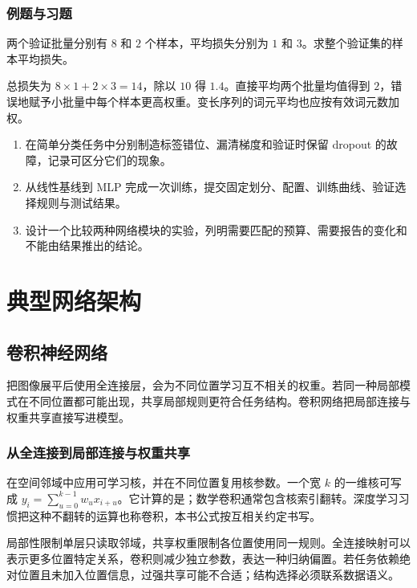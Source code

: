 \documentclass[UTF8,12pt,a4paper,fontset=fandol]{ctexbook}
\begin{document}
\section{例题与习题}
\begin{example}[正确汇总不等大小批量]
两个验证批量分别有 $8$ 和 $2$ 个样本，平均损失分别为 $1$ 和 $3$。求整个验证集的样本平均损失。
\end{example}
\begin{solve}
总损失为 $8\times1+2\times3=14$，除以 $10$ 得 $1.4$。直接平均两个批量均值得到 $2$，错误地赋予小批量中每个样本更高权重。变长序列的词元平均也应按有效词元数加权。
\end{solve}
\begin{enumerate}
\item 在简单分类任务中分别制造标签错位、漏清梯度和验证时保留 dropout 的故障，记录可区分它们的现象。
\item 从线性基线到 MLP 完成一次训练，提交固定划分、配置、训练曲线、验证选择规则与测试结果。
\item 设计一个比较两种网络模块的实验，列明需要匹配的预算、需要报告的变化和不能由结果推出的结论。
\end{enumerate}

\part{典型网络架构}

\chapter{卷积神经网络}
\label{chap:dl-cnn}
把图像展平后使用全连接层，会为不同位置学习互不相关的权重。若同一种局部模式在不同位置都可能出现，共享局部规则更符合任务结构。卷积网络把局部连接与权重共享直接写进模型。

\section{从全连接到局部连接与权重共享}
在空间邻域中应用可学习核，并在不同位置复用核参数。一个宽 $k$ 的一维核可写成 $y_i=\sum_{u=0}^{k-1}w_ux_{i+u}$。它计算的是；数学卷积通常包含核索引翻转。深度学习习惯把这种不翻转的运算也称卷积，本书公式按互相关约定书写。

局部性限制单层只读取邻域，共享权重限制各位置使用同一规则。全连接映射可以表示更多位置特定关系，卷积则减少独立参数，表达一种归纳偏置。若任务依赖绝对位置且未加入位置信息，过强共享可能不合适；结构选择必须联系数据语义。
\end{document}
